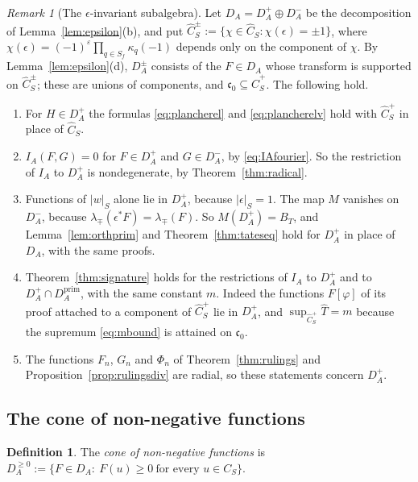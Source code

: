 \documentclass[11pt]{amsart}
\theoremstyle{definition}
\newtheorem{definition}[theorem]{Definition}
\theoremstyle{remark}
\newtheorem{remark}[theorem]{Remark}
\newcommand{\Th}{\widehat{T}}
\newcommand{\Ch}{\widehat{C}_S}
\newcommand{\DA}{D_A}
\newcommand{\BT}{B_T}
\begin{document}
\begin{remark}[The $\epsilon$-invariant subalgebra]\label{rem:plus}
Let $\DA=\DA^{+}\oplus\DA^{-}$ be the decomposition of
Lemma~\ref{lem:epsilon}(b), and put
$\Ch^{\pm}:=\{\chi\in\Ch:\chi(\epsilon)=\pm1\}$, where
$\chi(\epsilon)=(-1)^{\varepsilon}\prod_{q\in S_f}\kappa_q(-1)$ depends only on
the component of $\chi$.  By Lemma~\ref{lem:epsilon}(d), $\DA^{\pm}$ consists
of the $F\in\DA$ whose transform is supported on $\Ch^{\pm}$; these are unions
of components, and $\mathfrak c_0\subseteq\Ch^{+}$.  The following hold.
\begin{enumerate}
\item[(i)] For $H\in\DA^{+}$ the formulas \eqref{eq:plancherel} and
\eqref{eq:plancherelv} hold with $\Ch^{+}$ in place of $\Ch$.
\item[(ii)] $I_A(F,G)=0$ for $F\in\DA^{+}$ and $G\in\DA^{-}$, by
\eqref{eq:IAfourier}.  So the restriction of $I_A$ to $\DA^{+}$ is
nondegenerate, by Theorem~\ref{thm:radical}.
\item[(iii)] Functions of $|w|_S$ alone lie in $\DA^{+}$, because
$|\epsilon|_S=1$.  The map $M$ vanishes on $\DA^{-}$, because
$\lambda_{\mp}(\epsilon^{*}F)=\lambda_{\mp}(F)$.  So $M(\DA^{+})=\BT$,
and Lemma~\ref{lem:orthprim} and Theorem~\ref{thm:tateseq} hold for
$\DA^{+}$ in place of $\DA$, with the same proofs.
\item[(iv)] Theorem~\ref{thm:signature} holds for the restrictions of $I_A$
to $\DA^{+}$ and to $\DA^{+}\cap\DA^{\mathrm{prim}}$, with the same constant
$m$.  Indeed the functions $F[\varphi]$ of its proof attached to a component of
$\Ch^{+}$ lie in $\DA^{+}$, and $\sup_{\Ch^{+}}\Th=m$ because the supremum
\eqref{eq:mbound} is attained on $\mathfrak c_0$.
\item[(v)] The functions $F_n$, $G_n$ and $\Phi_n$ of
Theorem~\ref{thm:rulings} and Proposition~\ref{prop:rulingsdiv} are radial, so
these statements concern $\DA^{+}$.
\end{enumerate}
\end{remark}

\subsection{The cone of non-negative functions}\label{sec:eff}

\begin{definition}\label{def:eff}
The \emph{cone of non-negative functions} is
$\DA^{\ge0}:=\{F\in\DA:\ F(u)\ge0\ \text{for every }u\in C_S\}$.
\end{definition}
\end{document}
